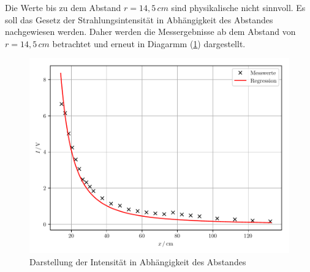 Die Werte bis zu dem Abstand $r = 14,5 \, cm$ sind physikalische nicht sinnvoll.
Es soll das Gesetz der Strahlungsintensität in Abhängigkeit des Abstandes nachgewiesen werden.
Daher werden die Messergebnisse ab dem Abstand von $r = 14,5 \, cm$ betrachtet und erneut in
Diagarmm (\ref{abb:7}) dargestellt.

\begin{figure}[H]
\centering
\includegraphics[width=\textwidth]{plot4.pdf}
\caption{Darstellung der Intensität in Abhängigkeit des Abstandes}
\label{abb:7}
\end{figure}
